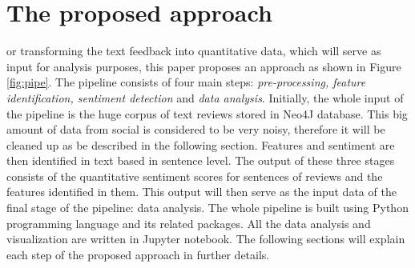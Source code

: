 
%
%
\let\textcircled=\pgftextcircled
\chapter{The proposed approach}

\label{chap:prop}

or transforming the text feedback into quantitative data, which will serve as input for analysis purposes, this paper proposes an approach as shown in Figure \ref{fig:pipe}. The pipeline consists of four main steps: \textit{pre-processing, feature identification, sentiment detection}  and \textit{data analysis}. Initially, the whole input of the pipeline is the huge corpus of text reviews stored in Neo4J database. This big amount of data from social is considered to be very noisy, therefore it will be cleaned up as be described in the following section. Features and sentiment are then identified in text based in sentence level. The output of these three stages consists of the quantitative sentiment scores for sentences of reviews and the features identified in them. This output will then serve as the input data of the final stage of the pipeline: data analysis.  
The whole pipeline is built using Python programming language and its related packages. All the data analysis and visualization are written in Jupyter notebook. The following sections will explain each step of the proposed approach in further details.
%
%
%
